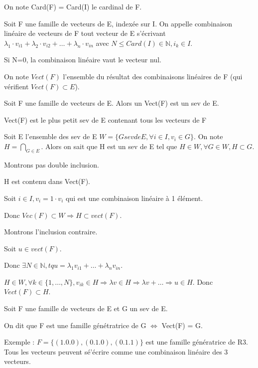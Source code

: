 \documentclass[french]{yLectureNote}
\newcommand{\N}[0]{\mathbb{N}}
\begin{document}
\begin{definition}
On note Card(F) = Card(I) le cardinal de F.
\end{definition}
\begin{definition}
Soit F une famille de vecteurs de E, indexée sur I. On appelle combinaison linéaire de vecteurs de F tout vecteur de E s'écrivant \(\lambda_1\cdot v_{i1}+\lambda_2\cdot v_{i2}+\dots+\lambda_n\cdot v_{in}\) avec \(N\leq Card(I)\in \N, i_k\in I\).

Si N=0, la combinaison linéaire vaut le vecteur nul.
\end{definition}
On note \(Vect(F)\) l'ensemble du résultat des combinaisons linéaires de F (qui vérifient \(Vect(F)\subset E\)).
\begin{proposition}
Soit F une famille de vecteurs de E. Alors un Vect(F) est un sev de E.
\end{proposition}
%
\begin{proposition}
Vect(F) est le plus petit sev de E contenant tous les vecteurs de F
\end{proposition}
\begin{myproof}
Soit E l'ensemble des sev de E \(W = \{G sev de E,\forall i\in I, v_i \in G\}\). On note \(H = \bigcap_{G\in E}\). Alors on sait que H est un sev de E tel que \(H\in W, \forall G\in W, H\subset G\).

Montrons pas double inclusion.

H est contenu dans Vect(F).

Soit \(i\in I, v_i = 1\cdot v_i\) qui est une combinaison linéaire à 1 élément.

Donc \(Vec(F)\subset W \Rightarrow H\subset vect(F)\).

Montrons l'inclusion contraire.

Soit \(u\in vect(F)\).

Donc \(\exists N\in \N, tq u = \lambda_1v_{i1}+\dots+\lambda_n v_{in}\).

\(H\in W, \forall k\in \{1,\dots,N\}, v_{ik}\in H \Rightarrow \lambda v \in H \Rightarrow \lambda v+\dots \Rightarrow u\in H\).
Donc \(Vect(F)\subset H\).
\end{myproof}
\begin{definition}
Soit F une famille de vecteurs de E et G un sev de E.

On dit que F est une famille génétratrice de G \(\iff\) Vect(F) = G.

\end{definition}
Exemple : \(F=\{(1.0.0),(0.1.0),(0.1.1)\}\) est une famille génératrice de R3. Tous les vecteurs peuvent sé'écrire comme une combinaison linéaire des 3 vecteurs.
\end{document}

